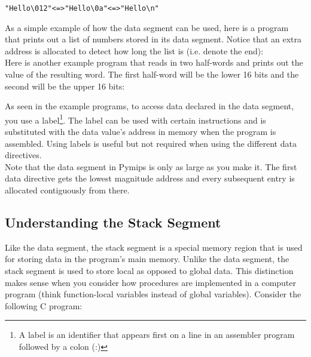 \documentclass[12pt]{article}
\begin{document}
\begin{addmargin}[0.5in]{0.5in}
    \begin{alltt}
        "Hello\textbackslash012" <=> "Hello\textbackslash0a" <=> "Hello\textbackslash n"
    \end{alltt}
\end{addmargin}

As a simple example of how the data segment can be used, here is a program that
     prints out a list of numbers stored in its data segment. Notice that an
     extra address is allocated to detect how long the list is (i.e. denote the
     end):\\



Here is another example program that reads in two half-words and prints out the
     value of the resulting word. The first half-word will be the lower 16 bits
     and the second will be the upper 16 bits:



As seen in the example programs, to access data declared in the data segment,
     you use a label\footnote{A label is an identifier that appears first on a
     line in an assembler program followed by a colon (:)}. The label can be
     used with certain instructions and is substituted with the data value's
     address in memory when the program is assembled. Using labels is useful but
     not required when using the different data directives.\\

Note that the data segment in Pymips is only as large as you make it. The first
     data directive gets the lowest magnitude address and every subsequent entry
     is allocated contiguously from there.

\subsection{Understanding the Stack Segment}

Like the data segment, the stack segment is a special memory region that is used
     for storing data in the program's main memory. Unlike the data segment, the
     stack segment is used to store local as opposed to global data. This
     distinction makes sense when you consider how procedures are implemented in
     a computer program (think function-local variables instead of global
     variables). Consider the following C program:\\
\end{document}
